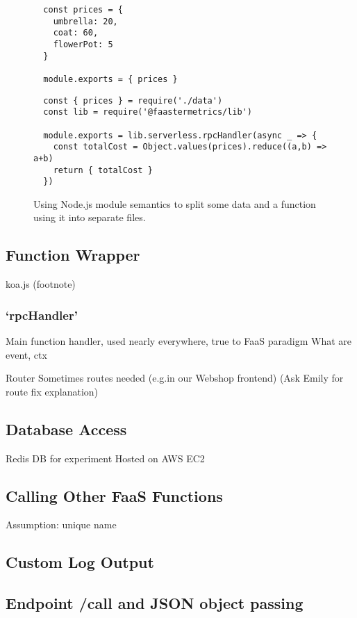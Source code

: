 \documentclass[../main.tex]{subfiles}
\begin{document}
\begin{figure}
\begin{tcolorbox}[left=3mm, right=3mm, top=3mm]
  \begin{tcolorbox}[enhanced, title={\texttt{[\ldots]/exampleFunction/data.js}}, attach boxed title to bottom left, boxed title style={sharp corners}]
  \begin{verbatim}
  const prices = {
    umbrella: 20,
    coat: 60,
    flowerPot: 5
  }

  module.exports = { prices }
  \end{verbatim}
  \end{tcolorbox}

  \begin{tcolorbox}[enhanced, title=\texttt{{[\ldots]/exampleFunction/index.js}}, attach boxed title to bottom left, boxed title style={sharp corners}]
  \begin{verbatim}
  const { prices } = require('./data')
  const lib = require('@faastermetrics/lib')

  module.exports = lib.serverless.rpcHandler(async _ => {
    const totalCost = Object.values(prices).reduce((a,b) => a+b)
    return { totalCost }
  })
  \end{verbatim}
  \end{tcolorbox}

\end{tcolorbox}
\caption{Using Node.js module semantics to split some data and a function using it into separate files.}%
\label{fig:dividingDataAndFunctionCodeNodeJS}
\end{figure}

\subsection{Function Wrapper}
koa.js (footnote)

\subsubsection{`rpcHandler'}%
\label{ssub:rpcHandler}
Main function handler, used nearly everywhere, true to FaaS paradigm
What are event, ctx

Router
Sometimes routes needed (e.g.\@ in our Webshop frontend)
(Ask Emily for route fix explanation)

\subsection{Database Access}
Redis DB for experiment
Hosted on AWS EC2

\subsection{Calling Other FaaS Functions}
Assumption: unique name


\subsection{Custom Log Output}

\subsection{Endpoint /call and JSON object passing}
\end{document}
